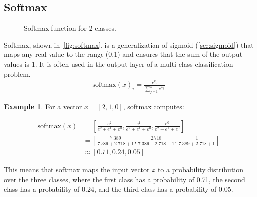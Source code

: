 \documentclass[oneside,11pt,dvipsnames]{book}
\numberwithin{equation}{section}
\theoremstyle{definition}
\newtheorem{example}{Example}[section]
\theoremstyle{remark}
\newcommand{\softmax}[1]{\mathrm{softmax}\left(#1\right)}
\begin{document}
\subsection{Softmax}\label{sec:softmax}


\begin{figure}[htp]
    \centering
    \caption{Softmax function for 2 classes.}\label{fig:softmax}
\end{figure}


Softmax, shown in~\autoref{fig:softmax}, is a generalization of sigmoid (\autoref{sec:sigmoid}) that maps any real value to the range (0,1) and ensures that the sum of the output values is 1. It is often used in the output layer of a multi-class classification problem.
\begin{align}
\softmax{x}_i = \frac{e^{x_i}}{\sum_{j=1}^{n}e^{x_j}}
\end{align}

\begin{example}
For a vector $x = [2, 1, 0]$, softmax computes:

{\small
\begin{align*}
\softmax{x} &= \left[\frac{e^2}{e^2+e^1+e^0}, \frac{e^1}{e^2+e^1+e^0}, \frac{e^0}{e^2+e^1+e^0}\right] \\
&= \left[\frac{7.389}{7.389+2.718+1}, \frac{2.718}{7.389+2.718+1}, \frac{1}{7.389+2.718+1}\right] \\
&\approx [0.71, 0.24, 0.05]
\end{align*}
}

This means that softmax maps the input vector $x$ to a probability distribution over the three classes, where the first class has a probability of 0.71, the second class has a probability of 0.24, and the third class has a probability of 0.05.
\end{example}
\end{document}
